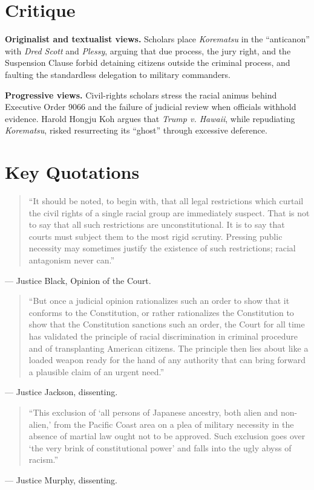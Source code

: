 \documentclass[12pt]{article}
\begin{document}
\section{Critique}

\textbf{Originalist and textualist views.} Scholars place \textit{Korematsu} in the ``anticanon'' with \textit{Dred Scott} and \textit{Plessy}, arguing that due process, the jury right, and the Suspension Clause forbid detaining citizens outside the criminal process, and faulting the standardless delegation to military commanders.

\textbf{Progressive views.} Civil-rights scholars stress the racial animus behind Executive Order 9066 and the failure of judicial review when officials withhold evidence. Harold Hongju Koh argues that \textit{Trump v. Hawaii}, while repudiating \textit{Korematsu}, risked resurrecting its ``ghost'' through excessive deference.

\section{Key Quotations}

\begin{quote}
``It should be noted, to begin with, that all legal restrictions which curtail the civil rights of a single racial group are immediately suspect. That is not to say that all such restrictions are unconstitutional. It is to say that courts must subject them to the most rigid scrutiny. Pressing public necessity may sometimes justify the existence of such restrictions; racial antagonism never can.''
\end{quote}
\noindent --- Justice Black, Opinion of the Court.

\begin{quote}
``But once a judicial opinion rationalizes such an order to show that it conforms to the Constitution, or rather rationalizes the Constitution to show that the Constitution sanctions such an order, the Court for all time has validated the principle of racial discrimination in criminal procedure and of transplanting American citizens. The principle then lies about like a loaded weapon ready for the hand of any authority that can bring forward a plausible claim of an urgent need.''
\end{quote}
\noindent --- Justice Jackson, dissenting.

\begin{quote}
``This exclusion of `all persons of Japanese ancestry, both alien and non-alien,' from the Pacific Coast area on a plea of military necessity in the absence of martial law ought not to be approved. Such exclusion goes over `the very brink of constitutional power' and falls into the ugly abyss of racism.''
\end{quote}
\noindent --- Justice Murphy, dissenting.
\end{document}
